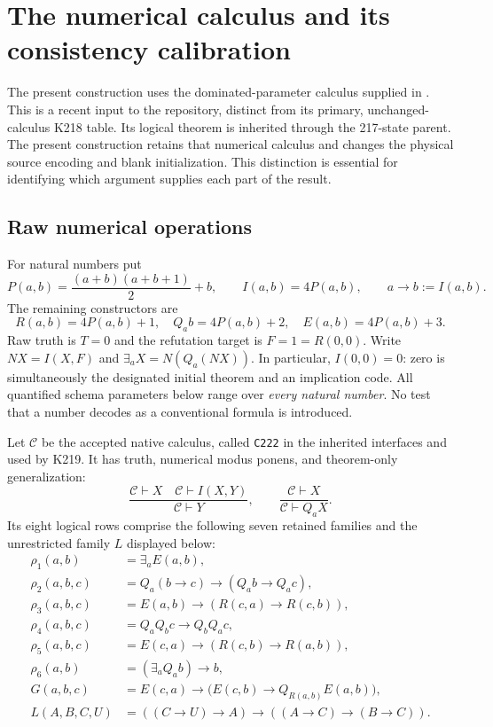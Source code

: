 \section{The numerical calculus and its consistency calibration}
\label{sec:native-calibration}

The present construction uses the dominated-parameter calculus supplied in
.  This is a recent input to the
repository, distinct from its primary, unchanged-calculus K218 table.
Its logical theorem is inherited through the 217-state parent. The present construction retains that numerical calculus and changes the physical source encoding and blank initialization.  This distinction is essential for identifying
which argument supplies each part of the result.

\subsection{Raw numerical operations}

For natural numbers put
\[
 P(a,b)=\frac{(a+b)(a+b+1)}2+b,
 \qquad I(a,b)=4P(a,b),\qquad a\to b:=I(a,b).
\]
The remaining constructors are
\[
 R(a,b)=4P(a,b)+1,\quad Q_a b=4P(a,b)+2,
 \quad E(a,b)=4P(a,b)+3.
\]
Raw truth is $T=0$ and the refutation target is $F=1=R(0,0)$.
Write $NX=I(X,F)$ and $\exists_a X=N(Q_a(NX))$.  In particular,
$I(0,0)=0$: zero is simultaneously the designated initial theorem and
an implication code.  All quantified schema parameters below range over
\emph{every natural number}.  No test that a number decodes as a conventional
formula is introduced.

Let $\mathcal C$ be the accepted native calculus, called \texttt{C222} in
the inherited interfaces and used by K219.  It has truth, numerical modus
ponens, and theorem-only generalization:
\[
 \frac{\mathcal C\vdash X\quad \mathcal C\vdash I(X,Y)}
      {\mathcal C\vdash Y},
 \qquad
 \frac{\mathcal C\vdash X}{\mathcal C\vdash Q_aX}.
\]
Its eight logical rows comprise the following seven retained families
and the unrestricted family $L$ displayed below:
\begin{align*}
 \rho_1(a,b)&=\exists_a E(a,b),\\
 \rho_2(a,b,c)&=Q_a(b\to c)\to(Q_ab\to Q_ac),\\
 \rho_3(a,b,c)&=E(a,b)\to(R(c,a)\to R(c,b)),\\
 \rho_4(a,b,c)&=Q_aQ_bc\to Q_bQ_ac,\\
 \rho_5(a,b,c)&=E(c,a)\to(R(c,b)\to R(a,b)),\\
 \rho_6(a,b)&=(\exists_a Q_ab)\to b,\\
 G(a,b,c)&=E(c,a)\to\bigl(E(c,b)\to Q_{R(a,b)}E(a,b)\bigr),\\
 L(A,B,C,U)&=((C\to U)\to A)\to((A\to C)\to(B\to C)).
\end{align*}

